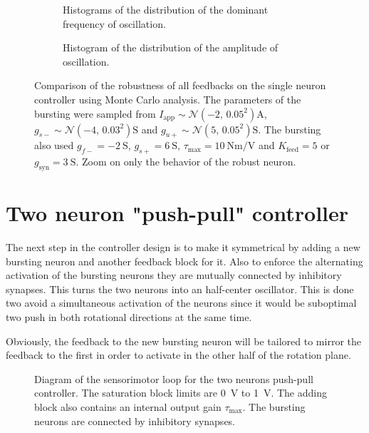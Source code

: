 \begin{figure}[!htbp]
    \centering
    \begin{subfigure}[t]{\textwidth}
        \centering
        \caption{Histograms of the distribution of the dominant frequency of oscillation.}
        \label{fig:single_monte_freq_robust}
    \end{subfigure}
    
    \begin{subfigure}[b]{\textwidth}
        \centering
        \caption{Histogram of the distribution of the amplitude of oscillation.}
        \label{fig:single_monte_range_robust}
    \end{subfigure}
    \caption{Comparison of the robustness of all feedbacks on the single neuron controller using Monte Carlo analysis. The parameters of the bursting were sampled from $I_\text{app} \sim \mathcal{N}\left(-2,\, 0.05^2\right) \unit{\ampere}$, $g_{s-} \sim \mathcal{N}\left(-4,\, 0.03^2\right) \unit{\siemens}$ and $g_{u+} \sim \mathcal{N}\left(5,\, 0.05^2\right) \unit{\siemens}$. The bursting also used $g_{f-} = \qty{-2}{\siemens}$, $g_{s+} = \qty{6}{\siemens}$, $\tau_\text{max} = \qty{10}{\newton\meter\per\volt}$ and $K_\text{feed} = 5$ or $g_{\text{syn}} = \qty{3}{\siemens}$. Zoom on only the behavior of  the robust neuron.}
    \label{fig:single_monte_robust}
\end{figure}

\FloatBarrier
\section{Two neuron "push-pull" controller}

The next step in the controller design is to make it symmetrical by adding a new bursting neuron and another feedback block for it. Also to enforce the alternating activation of the bursting neurons they are mutually connected by inhibitory synapses. This turns the two neurons into an half-center oscillator. This is done two avoid a simultaneous activation of the neurons since it would be suboptimal two push in both rotational directions at the same time. 

Obviously, the feedback to the new bursting neuron will be tailored to mirror the feedback to the first in order to activate in the other half of the rotation plane. 

\begin{figure}[!htb]
    \centering
    \caption{Diagram of the sensorimotor loop for the two neurons push-pull controller. The saturation block limits are \qty{0}{\volt} to \qty{1}{\volt}. The adding block also contains an internal output gain $\tau_\text{max}$. The bursting neurons are connected by inhibitory synapses.}
    \label{fig:two_motor}
\end{figure}

